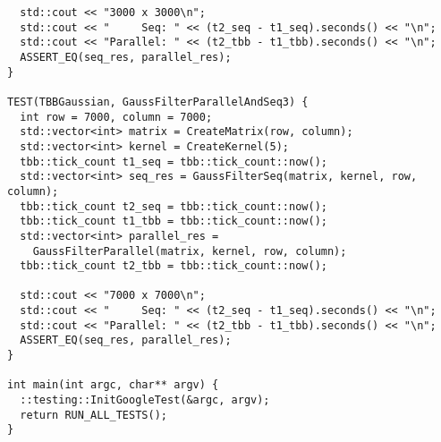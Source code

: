 \documentclass{report}
\begin{document}
\begin{lstlisting}
  std::cout << "3000 x 3000\n";
  std::cout << "     Seq: " << (t2_seq - t1_seq).seconds() << "\n";
  std::cout << "Parallel: " << (t2_tbb - t1_tbb).seconds() << "\n";
  ASSERT_EQ(seq_res, parallel_res);
}

TEST(TBBGaussian, GaussFilterParallelAndSeq3) {
  int row = 7000, column = 7000;
  std::vector<int> matrix = CreateMatrix(row, column);
  std::vector<int> kernel = CreateKernel(5);
  tbb::tick_count t1_seq = tbb::tick_count::now();
  std::vector<int> seq_res = GaussFilterSeq(matrix, kernel, row, column);
  tbb::tick_count t2_seq = tbb::tick_count::now();
  tbb::tick_count t1_tbb = tbb::tick_count::now();
  std::vector<int> parallel_res =
    GaussFilterParallel(matrix, kernel, row, column);
  tbb::tick_count t2_tbb = tbb::tick_count::now();

  std::cout << "7000 x 7000\n";
  std::cout << "     Seq: " << (t2_seq - t1_seq).seconds() << "\n";
  std::cout << "Parallel: " << (t2_tbb - t1_tbb).seconds() << "\n";
  ASSERT_EQ(seq_res, parallel_res);
}

int main(int argc, char** argv) {
  ::testing::InitGoogleTest(&argc, argv);
  return RUN_ALL_TESTS();
}

\end{lstlisting}
\end{document}
